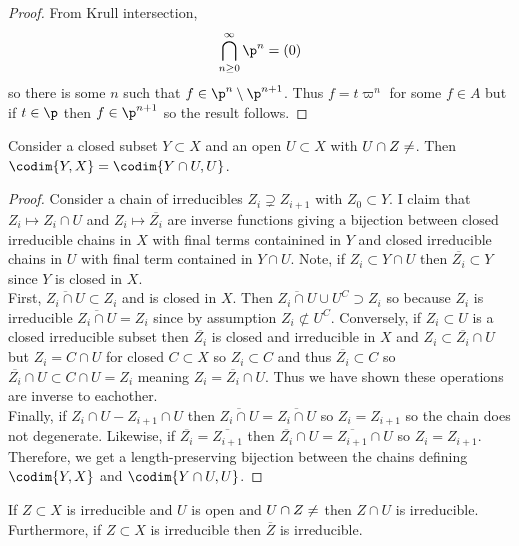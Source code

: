 \documentclass[12pt]{article}
\begin{document}
\begin{proof}
From Krull intersection,
\[ \bigcap_{n \ge 0}^\infty \p^n = (0) \]
so there is some $n$ such that $f \in \p^n \setminus \p^{n+1}$. Thus $f = t \varpi^n$ for some $f \in A$ but if $t \in \p$ then $f \in \p^{n+1}$ so the result follows.
\end{proof}

\begin{lemma} \label{codimension_opens}
Consider a closed subset $Y \subset X$ and an open $U \subset X$ with $U \cap Z \neq \empty$. Then $\codim{Y, X} = \codim{Y \cap U, U}$. 
\end{lemma}

\begin{proof}
Consider a chain of irreducibles $Z_i \supsetneq Z_{i+1}$ with $Z_0 \subset Y$. I claim that $Z_i \mapsto Z_i \cap U$ and $Z_i \mapsto \overline{Z_i}$ are inverse functions giving a bijection between closed irreducible chains in $X$ with final terms containined in $Y$ and closed irreducible chains in $U$ with final term contained in $Y \cap  U$. Note, if $Z_i \subset Y \cap U$ then $\overline{Z_i} \subset Y$ since $Y$ is closed in $X$.
\bigskip\\
First, $\overline{Z_i \cap U} \subset Z_i$ and is closed in $X$. Then $\overline{Z_i \cap U} \cup U^C \supset Z_i$ so because $Z_i$ is irreducible $\overline{Z_i \cap U} = Z_i$ since by assumption $Z_i \not\subset U^C$. Conversely, if $Z_i \subset U$ is a closed irreducible subset then $\overline{Z_i}$ is closed and irreducible in $X$ and $Z_i \subset \overline{Z_i} \cap U$ but $Z_i = C \cap U$ for closed $C \subset X$ so $Z_i \subset C$ and thus $\overline{Z_i} \subset C$ so $\overline{Z_i} \cap U \subset C \cap U = Z_i$ meaning $Z_i = \overline{Z_i} \cap U$. Thus we have shown these operations are inverse to eachother.
\bigskip\\
Finally, if $Z_i \cap U - Z_{i+1} \cap U$ then $\overline{Z_i \cap U} = \overline{Z_i \cap U}$ so $Z_i = Z_{i+1}$ so the chain does not degenerate. Likewise, if $\overline{Z_i} = \overline{Z_{i+1}}$ then $\overline{Z_i} \cap U = \overline{Z_{i+1}} \cap U$ so $Z_i = Z_{i+1}$. Therefore, we get a length-preserving bijection between the chains defining $\codim{Y,X}$ and $\codim{Y \cap U, U}$. 
\end{proof}

\begin{lemma}
If $Z \subset X$ is irreducible and $U$ is open and $U \cap Z \neq \empty$ then $Z \cap U$ is irreducible. Furthermore, if $Z \subset X$ is irreducible then $\overline{Z}$ is irreducible.
\end{lemma}
\end{document}
